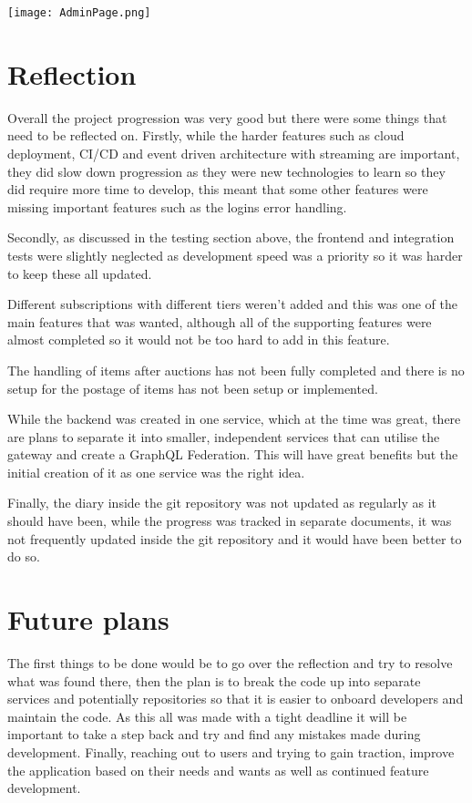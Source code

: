 \documentclass[]{project_report}
\begin{document}
\texttt{[image: AdminPage.png]}



\chapter{Reflection}
Overall the project progression was very good but there were some things that need to be reflected on. Firstly, while the harder features such as cloud deployment, CI/CD and event driven architecture with streaming are important, they did slow down progression as they were new technologies to learn so they did require more time to develop, this meant that some other features were missing important features such as the logins error handling. 

Secondly, as discussed in the testing section above, the frontend and integration tests were slightly neglected as development speed was a priority so it was harder to keep these all updated.

Different subscriptions with different tiers weren't added and this was one of the main features that was wanted, although all of the supporting features were almost completed so it would not be too hard to add in this feature.

The handling of items after auctions has not been fully completed and there is no setup for the postage of items has not been setup or implemented.

While the backend was created in one service, which at the time was great, there are plans to separate it into smaller, independent services that can utilise the gateway and create a GraphQL Federation. This will have great benefits but the initial creation of it as one service was the right idea.

Finally, the diary inside the git repository was not updated as regularly as it should have been, while the progress was tracked in separate documents, it was not frequently updated inside the git repository and it would have been better to do so.

\chapter{Future plans}
The first things to be done would be to go over the reflection and try to resolve what was found there, then the plan is to break the code up into separate services and potentially repositories so that it is easier to onboard developers and maintain the code. As this all was made with a tight deadline it will be important to take a step back and try and find any mistakes made during development. Finally, reaching out to users and trying to gain traction, improve the application based on their needs and wants as well as continued feature development.
\end{document}
